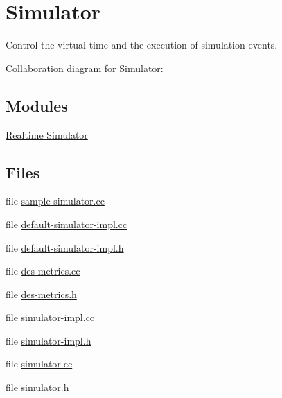 \hypertarget{group__simulator}{}\section{Simulator}
\label{group__simulator}


Control the virtual time and the execution of simulation events.  


Collaboration diagram for Simulator\+:
\subsection*{Modules}
\begin{DoxyCompactItemize}
\item 
\hyperlink{group__realtime}{Realtime Simulator}
\end{DoxyCompactItemize}
\subsection*{Files}
\begin{DoxyCompactItemize}
\item 
file \hyperlink{sample-simulator_8cc}{sample-\/simulator.\+cc}
\item 
file \hyperlink{default-simulator-impl_8cc}{default-\/simulator-\/impl.\+cc}
\item 
file \hyperlink{default-simulator-impl_8h}{default-\/simulator-\/impl.\+h}
\item 
file \hyperlink{des-metrics_8cc}{des-\/metrics.\+cc}
\item 
file \hyperlink{des-metrics_8h}{des-\/metrics.\+h}
\item 
file \hyperlink{simulator-impl_8cc}{simulator-\/impl.\+cc}
\item 
file \hyperlink{simulator-impl_8h}{simulator-\/impl.\+h}
\item 
file \hyperlink{simulator_8cc}{simulator.\+cc}
\item 
file \hyperlink{simulator_8h}{simulator.\+h}
\end{DoxyCompactItemize}
